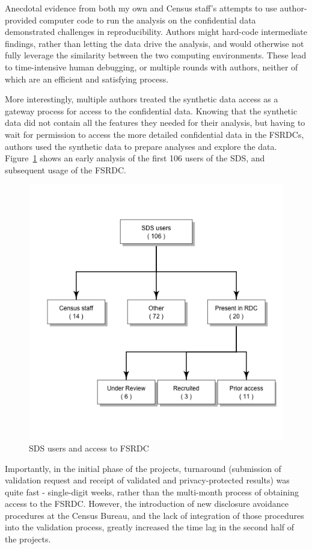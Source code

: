 \documentclass[inline]{hdsr}
\begin{document}
Anecdotal evidence from both my own and Census staff's attempts to use author-provided computer code to run the analysis on the confidential data demonstrated challenges in reproducibility. Authors might hard-code intermediate findings, rather than letting the data drive the analysis, and would otherwise not fully leverage the similarity between the two computing environments. These lead to time-intensive human debugging, or multiple rounds with authors, neither of which are an efficient and satisfying process. 

More interestingly, multiple authors treated the synthetic data access as a gateway process for access to the confidential data. Knowing that the synthetic data did not contain all the features they needed for their analysis, but having to wait for permission to access the more detailed confidential data in the \acp{FSRDC}, authors used the synthetic data to prepare analyses and explore the data. Figure~\ref{fig:useRDC} shows an early analysis of the first 106 users of the \ac{SDS}, and subsequent usage of the \ac{FSRDC}. 

\begin{figure}
    \centering
    \includegraphics[width=0.5\linewidth]{useRDCgraph.png}
    \caption{SDS users and access to FSRDC}
    \label{fig:useRDC}
\end{figure}

Importantly, in the initial phase of the projects, turnaround (submission of validation request and receipt of validated and privacy-protected results) was quite fast - single-digit weeks, rather than the multi-month process of obtaining access to the \ac{FSRDC}. However, the introduction of new disclosure avoidance procedures at the Census Bureau, and the lack of integration of those procedures into the validation process, greatly increased the time lag in the second half of the projects.
\end{document}

